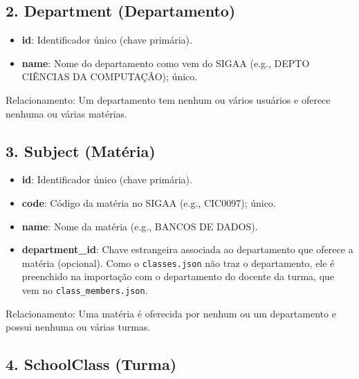 \documentclass[a4paper,12pt]{article}
\begin{document}
\subsection*{2. Department (Departamento)}

\begin{itemize}

    \item \textbf{id}: Identificador único (chave primária).

    \item \textbf{name}: Nome do departamento como vem do SIGAA (e.g., DEPTO CIÊNCIAS DA COMPUTAÇÃO); único.

\end{itemize}

Relacionamento: Um departamento tem nenhum ou vários usuários e oferece nenhuma ou várias matérias.

\subsection*{3. Subject (Matéria)}

\begin{itemize}

    \item \textbf{id}: Identificador único (chave primária).

    \item \textbf{code}: Código da matéria no SIGAA (e.g., CIC0097); único.

    \item \textbf{name}: Nome da matéria (e.g., BANCOS DE DADOS).

    \item \textbf{department\_id}: Chave estrangeira associada ao departamento que oferece a matéria (opcional). Como o \texttt{classes.json} não traz o departamento, ele é preenchido na importação com o departamento do docente da turma, que vem no \texttt{class\_members.json}.

\end{itemize}

Relacionamento: Uma matéria é oferecida por nenhum ou um departamento e possui nenhuma ou várias turmas.

\subsection*{4. SchoolClass (Turma)}
\end{document}
